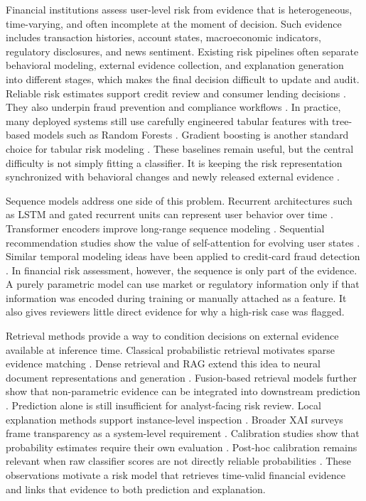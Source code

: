 \documentclass[runningheads]{llncs}
\begin{document}
Financial institutions assess user-level risk from evidence that is heterogeneous, time-varying, and often incomplete at the moment of decision. Such evidence includes transaction histories, account states, macroeconomic indicators, regulatory disclosures, and news sentiment. Existing risk pipelines often separate behavioral modeling, external evidence collection, and explanation generation into different stages, which makes the final decision difficult to update and audit. Reliable risk estimates support credit review and consumer lending decisions \cite{hand1997statistical,thomas2000survey}. They also underpin fraud prevention and compliance workflows \cite{bolton2002statistical,ngai2011application}. In practice, many deployed systems still use carefully engineered tabular features with tree-based models such as Random Forests \cite{breiman2001random}. Gradient boosting is another standard choice for tabular risk modeling \cite{friedman2001greedy,chen2016xgboost}. These baselines remain useful, but the central difficulty is not simply fitting a classifier. It is keeping the risk representation synchronized with behavioral changes and newly released external evidence \cite{crook2007recent,lessmann2015benchmarking}.

Sequence models address one side of this problem. Recurrent architectures such as LSTM and gated recurrent units can represent user behavior over time \cite{hochreiter1997lstm,cho2014learning}. Transformer encoders improve long-range sequence modeling \cite{vaswani2017attention}. Sequential recommendation studies show the value of self-attention for evolving user states \cite{kang2018sasrec,sun2019bert4rec}. Similar temporal modeling ideas have been applied to credit-card fraud detection \cite{jurgovsky2018sequence}. In financial risk assessment, however, the sequence is only part of the evidence. A purely parametric model can use market or regulatory information only if that information was encoded during training or manually attached as a feature. It also gives reviewers little direct evidence for why a high-risk case was flagged.

Retrieval methods provide a way to condition decisions on external evidence available at inference time. Classical probabilistic retrieval motivates sparse evidence matching \cite{robertson2009probabilistic}. Dense retrieval and RAG extend this idea to neural document representations and generation \cite{karpukhin2020dpr,lewis2020rag}. Fusion-based retrieval models further show that non-parametric evidence can be integrated into downstream prediction \cite{izacard2021leveraging}. Prediction alone is still insufficient for analyst-facing risk review. Local explanation methods support instance-level inspection \cite{ribeiro2016lime,lundberg2017shap}. Broader XAI surveys frame transparency as a system-level requirement \cite{guidotti2018survey,arrieta2020explainable}. Calibration studies show that probability estimates require their own evaluation \cite{guo2017calibration,niculescu2005predicting}. Post-hoc calibration remains relevant when raw classifier scores are not directly reliable probabilities \cite{zadrozny2002transforming}. These observations motivate a risk model that retrieves time-valid financial evidence and links that evidence to both prediction and explanation.
\end{document}
